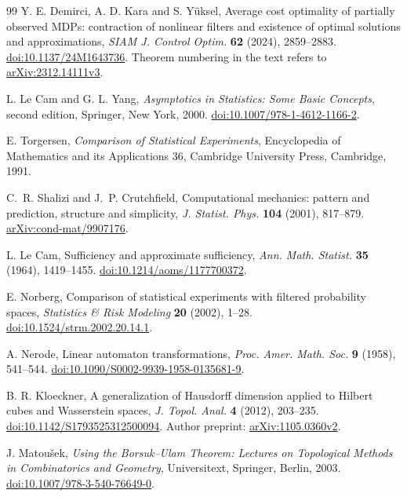 \begin{thebibliography}{99}
Y. E. Demirci, A. D. Kara and S. Y\"uksel, Average cost optimality of
partially observed MDPs: contraction of nonlinear filters and existence
of optimal solutions and approximations,
\emph{SIAM J. Control Optim.} \textbf{62} (2024), 2859--2883.
\href{https://doi.org/10.1137/24M1643736}{doi:10.1137/24M1643736}.
Theorem numbering in the text refers to
\href{https://arxiv.org/abs/2312.14111v3}{arXiv:2312.14111v3}.

L. Le Cam and G. L. Yang, \emph{Asymptotics in Statistics: Some Basic
Concepts}, second edition, Springer, New York, 2000.
\href{https://doi.org/10.1007/978-1-4612-1166-2}{doi:10.1007/978-1-4612-1166-2}.

E. Torgersen, \emph{Comparison of Statistical Experiments},
Encyclopedia of Mathematics and its Applications 36,
Cambridge University Press, Cambridge, 1991.

C.~R. Shalizi and J.~P. Crutchfield,
Computational mechanics: pattern and prediction, structure and simplicity,
\emph{J. Statist. Phys.} \textbf{104} (2001), 817--879.
\href{https://arxiv.org/abs/cond-mat/9907176}{arXiv:cond-mat/9907176}.


L. Le Cam, Sufficiency and approximate sufficiency,
\emph{Ann. Math. Statist.} \textbf{35} (1964), 1419--1455.
\href{https://doi.org/10.1214/aoms/1177700372}{doi:10.1214/aoms/1177700372}.

E. Norberg, Comparison of statistical experiments with filtered
probability spaces, \emph{Statistics \& Risk Modeling} \textbf{20}
(2002), 1--28.
\href{https://doi.org/10.1524/strm.2002.20.14.1}{doi:10.1524/strm.2002.20.14.1}.

A. Nerode, Linear automaton transformations,
\emph{Proc. Amer. Math. Soc.} \textbf{9} (1958), 541--544.
\href{https://doi.org/10.1090/S0002-9939-1958-0135681-9}{doi:10.1090/S0002-9939-1958-0135681-9}.

B. R. Kloeckner, A generalization of Hausdorff dimension applied to
Hilbert cubes and Wasserstein spaces,
\emph{J. Topol. Anal.} \textbf{4} (2012), 203--235.
\href{https://doi.org/10.1142/S1793525312500094}{doi:10.1142/S1793525312500094}.
Author preprint: \href{https://arxiv.org/abs/1105.0360v2}{arXiv:1105.0360v2}.

J. Matou\v{s}ek, \emph{Using the Borsuk--Ulam Theorem: Lectures on
Topological Methods in Combinatorics and Geometry}, Universitext,
Springer, Berlin, 2003.
\href{https://doi.org/10.1007/978-3-540-76649-0}{doi:10.1007/978-3-540-76649-0}.


\end{thebibliography}
